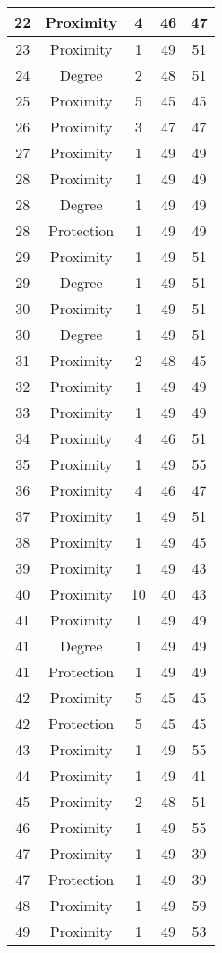 \documentclass[results.tex]{subfiles}
\begin{document}
\begin{center}
\begin{tabular}{| c || c | c | c | c |}
    \hline
    22 & Proximity & 4 & 46 & 47 \\ 
    \hline
    23 & Proximity & 1 & 49 & 51 \\ 
    \hline
    24 & Degree & 2 & 48 & 51 \\ 
    \hline
    25 & Proximity & 5 & 45 & 45 \\ 
    \hline
    26 & Proximity & 3 & 47 & 47 \\ 
    \hline
    27 & Proximity & 1 & 49 & 49 \\ 
    \hline
    28 & Proximity & 1 & 49 & 49 \\ 
    \hline
    28 & Degree & 1 & 49 & 49 \\ 
    \hline
    28 & Protection & 1 & 49 & 49 \\ 
    \hline
    29 & Proximity & 1 & 49 & 51 \\ 
    \hline
    29 & Degree & 1 & 49 & 51 \\ 
    \hline
    30 & Proximity & 1 & 49 & 51 \\ 
    \hline
    30 & Degree & 1 & 49 & 51 \\ 
    \hline
    31 & Proximity & 2 & 48 & 45 \\ 
    \hline
    32 & Proximity & 1 & 49 & 49 \\ 
    \hline
    33 & Proximity & 1 & 49 & 49 \\ 
    \hline
    34 & Proximity & 4 & 46 & 51 \\ 
    \hline
    35 & Proximity & 1 & 49 & 55 \\ 
    \hline
    36 & Proximity & 4 & 46 & 47 \\ 
    \hline
    37 & Proximity & 1 & 49 & 51 \\ 
    \hline
    38 & Proximity & 1 & 49 & 45 \\ 
    \hline
    39 & Proximity & 1 & 49 & 43 \\ 
    \hline
    40 & Proximity & 10 & 40 & 43 \\ 
    \hline
    41 & Proximity & 1 & 49 & 49 \\ 
    \hline
    41 & Degree & 1 & 49 & 49 \\ 
    \hline
    41 & Protection & 1 & 49 & 49 \\ 
    \hline
    42 & Proximity & 5 & 45 & 45 \\ 
    \hline
    42 & Protection & 5 & 45 & 45 \\ 
    \hline
    43 & Proximity & 1 & 49 & 55 \\ 
    \hline
    44 & Proximity & 1 & 49 & 41 \\ 
    \hline
    45 & Proximity & 2 & 48 & 51 \\ 
    \hline
    46 & Proximity & 1 & 49 & 55 \\ 
    \hline
    47 & Proximity & 1 & 49 & 39 \\ 
    \hline
    47 & Protection & 1 & 49 & 39 \\ 
    \hline
    48 & Proximity & 1 & 49 & 59 \\ 
    \hline
    49 & Proximity & 1 & 49 & 53 \\ 
    \hline   \end{tabular}
\end{center}
\end{document}
